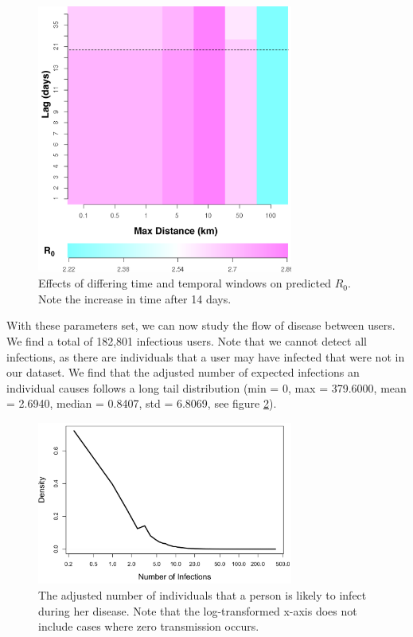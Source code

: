 \begin{figure}
\centering
\includegraphics[width=0.75\textwidth]{longitude/figs/r0heatmap.png}
\caption[Effects of differing time and temporal windows on predicted R0. Note the increase in time after 14 days.]{Effects of differing time and temporal windows on predicted \(R_0\). Note the increase in time after 14 days.}
\label{fig:r0heatmap}
\end{figure}


With these parameters set, we can now study the flow of disease between users. We find a total of 182,801 infectious users. Note that we cannot detect all infections, as there are individuals that a user may have infected that were not in our dataset. We find that the adjusted number of expected infections an individual causes follows a long tail distribution (min = 0, max = 379.6000, mean = 2.6940, median = 0.8407, std = 6.8069, see figure \ref{fig:r0distribution}). 


\begin{figure}
\centering
\includegraphics[width=0.75\textwidth]{longitude/figs/r0distribution.png}
\caption{The adjusted number of individuals that a person is likely to infect during her disease. Note that the log-transformed x-axis does not include cases where zero transmission occurs.}
\label{fig:r0distribution}
\end{figure}




